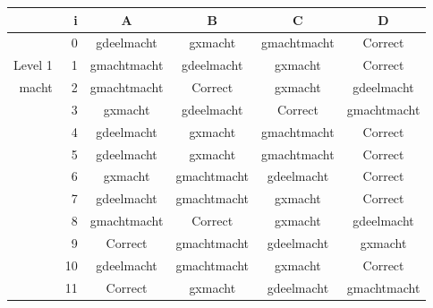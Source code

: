 \begin{tabular}{ rr| c|c|c|c}\hline\hline
     & i & \textbf{A} & \textbf{B} & \textbf{C} & \textbf{D}\\\hline

&0&gdeelmacht&gxmacht&gmachtmacht&Correct\cellcolor[gray]{0.6}\\
Level 1 & 1&gmachtmacht&gdeelmacht&gxmacht&Correct\cellcolor[gray]{0.6}\\
macht &2&gmachtmacht&Correct\cellcolor[gray]{0.6}&gxmacht&gdeelmacht\\
&3&gxmacht&gdeelmacht&Correct\cellcolor[gray]{0.6}&gmachtmacht\\
&4&gdeelmacht&gxmacht&gmachtmacht&Correct\cellcolor[gray]{0.6}\\
&5&gdeelmacht&gxmacht&gmachtmacht&Correct\cellcolor[gray]{0.6}\\
&6&gxmacht&gmachtmacht&gdeelmacht&Correct\cellcolor[gray]{0.6}\\
&7&gdeelmacht&gmachtmacht&gxmacht&Correct\cellcolor[gray]{0.6}\\
&8&gmachtmacht&Correct\cellcolor[gray]{0.6}&gxmacht&gdeelmacht\\
&9&Correct\cellcolor[gray]{0.6}&gmachtmacht&gdeelmacht&gxmacht\\
&10&gdeelmacht&gmachtmacht&gxmacht&Correct\cellcolor[gray]{0.6}\\
&11&Correct\cellcolor[gray]{0.6}&gxmacht&gdeelmacht&gmachtmacht\\
\hline\end{tabular}\par\ \newline


